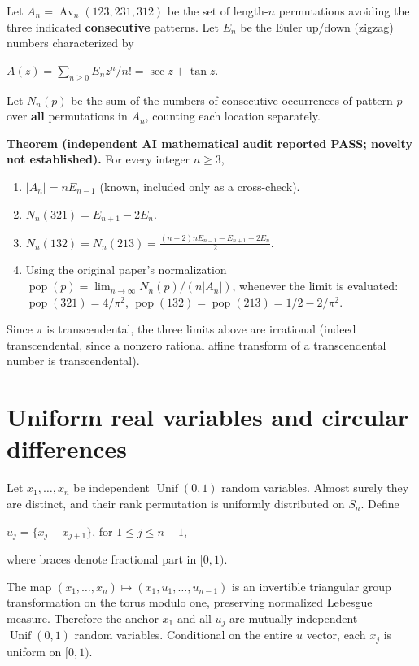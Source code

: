 \documentclass[
  11pt,
]{article}
\providecommand{\tightlist}{%
  \setlength{\itemsep}{0pt}\setlength{\parskip}{0pt}}
\let\oldsection\section
\renewcommand{\section}{\needspace{5\baselineskip}\oldsection}
\begin{document}
Let \(A_n=\operatorname{Av}_n(123,231,312)\) be the set of length-\(n\)
permutations avoiding the three indicated \textbf{consecutive} patterns.
Let \(E_n\) be the Euler up/down (zigzag) numbers characterized by

\(A(z)=\sum_{n\geq0} E_n z^n/n!=\sec z+\tan z\).

Let \(N_n(p)\) be the sum of the numbers of consecutive occurrences of
pattern \(p\) over \textbf{all} permutations in \(A_n\), counting each
location separately.


\textbf{Theorem (independent AI mathematical audit reported PASS;
novelty not established).} For every integer \(n\geq3\),

\begin{enumerate}
\def\labelenumi{\arabic{enumi}.}
\tightlist
\item
  \(|A_n|=nE_{n-1}\) (known, included only as a cross-check).
\item
  \(N_n(321)=E_{n+1}-2E_n\).
\item
  \(N_n(132)=N_n(213)=\frac{(n-2)nE_{n-1}-E_{n+1}+2E_n}{2}\).
\item
  Using the original paper's normalization
  \(\operatorname{pop}(p)=\lim_{n\to\infty}N_n(p)/(n|A_n|)\), whenever
  the limit is evaluated: \(\operatorname{pop}(321)=4/\pi^2\),
  \(\operatorname{pop}(132)=\operatorname{pop}(213)=1/2-2/\pi^2\).
\end{enumerate}

Since \(\pi\) is transcendental, the three limits above are irrational
(indeed transcendental, since a nonzero rational affine transform of a
transcendental number is transcendental).

\section{Uniform real variables and circular
differences}\label{uniform-real-variables-and-circular-differences}

Let \(x_1,\ldots,x_n\) be independent \(\operatorname{Unif}(0,1)\)
random variables. Almost surely they are distinct, and their rank
permutation is uniformly distributed on \(S_n\). Define

\(u_j=\{x_j-x_{j+1}\}\), for \(1\leq j\leq n-1\),

where braces denote fractional part in \([0,1)\).

The map \((x_1,\ldots,x_n)\longmapsto(x_1,u_1,\ldots,u_{n-1})\) is an
invertible triangular group transformation on the torus modulo one,
preserving normalized Lebesgue measure. Therefore the anchor \(x_1\) and
all \(u_j\) are mutually independent \(\operatorname{Unif}(0,1)\) random
variables. Conditional on the entire \(u\) vector, each \(x_j\) is
uniform on \([0,1)\).
\end{document}

